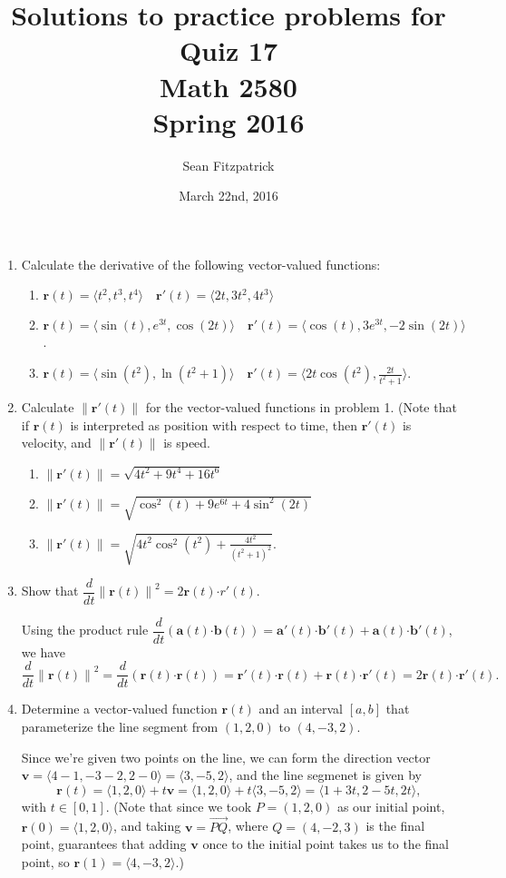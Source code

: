 \documentclass[letterpaper,12pt]{article}
\title{Solutions to practice problems for Quiz 17\\Math 2580\\Spring 2016}
\author{Sean Fitzpatrick}
\date{March 22nd, 2016}
\renewcommand{\r}{\mathbf{r}}
\newcommand{\len}[1]{\left\lVert #1\right\rVert}
\newcommand{\dotp}{\boldsymbol{\cdot}}
\begin{document}
 \maketitle


\begin{enumerate}
 \item Calculate the derivative of the following vector-valued functions:
\begin{enumerate}
 \item $\r(t) = \langle t^2, t^3, t^4\rangle \quad \r'(t) = \langle 2t, 3t^2, 4t^3\rangle$


 \item $\r(t) = \langle \sin(t), e^{3t}, \cos(2t)\rangle \quad \r'(t) = \langle \cos(t), 3e^{3t}, -2\sin(2t)\rangle$.

 \item $\r(t) = \langle \sin(t^2), \ln(t^2+1)\rangle \quad \r'(t) = \langle 2t\cos(t^2), \frac{2t}{t^2+1}\rangle$.
\end{enumerate}
 \item Calculate $\len{\r'(t)}$ for the vector-valued functions in problem 1. (Note that if $\r(t)$ is interpreted as position with respect to time, then $\r'(t)$ is velocity, and $\len{\r'(t)}$ is speed.

\begin{enumerate}
 \item $\len{\r'(t)} = \sqrt{4t^2+9t^4+16t^6}$
 \item $\len{\r'(t)} = \sqrt{\cos^2(t)+9e^{6t}+4\sin^2(2t)}$
 \item $\len{\r'(t)} = \sqrt{4t^2\cos^2(t^2)+\frac{4t^2}{(t^2+1)^2}}$.
\end{enumerate}


 \item Show that $\dfrac{d}{dt}\len{\r(t)}^2 = 2\r(t)\dotp r'(t)$.

\bigskip

Using the product rule $\dfrac{d}{dt}(\mathbf{a}(t)\dotp\mathbf{b}(t)) = \mathbf{a}'(t)\dotp\mathbf{b}'(t) + \mathbf{a}(t)\dotp\mathbf{b}'(t)$, we have
\[
 \frac{d}{dt}\len{\r(t)}^2 = \frac{d}{dt}(\r(t)\dotp \r(t)) = \r'(t)\dotp\r(t)+ \r(t)\dotp\r'(t) = 2\r(t)\dotp\r'(t).
\]
 
 \item Determine a vector-valued function $\r(t)$ and an interval $[a,b]$ that parameterize the line segment from $(1,2,0)$ to $(4,-3,2)$.

\bigskip

 Since we're given two points on the line, we can form the direction vector $\mathbf{v} = \langle 4-1, -3-2, 2-0\rangle = \langle 3, -5, 2\rangle$, and the line segmenet is given by
\[
 \r(t) = \langle 1,2,0\rangle + t\mathbf{v} = \langle 1,2,0\rangle+t\langle 3, -5, 2\rangle = \langle 1+3t, 2-5t, 2t\rangle,
\]
with $t\in [0,1]$. (Note that since we took $P=(1,2,0)$ as our initial point, $\r(0)=\langle 1,2,0\rangle$, and taking $\mathbf{v} = \overrightarrow{PQ}$, where $Q=(4,-2,3)$ is the final point, guarantees that adding $\mathbf{v}$ once to the initial point takes us to the final point, so $\r(1) = \langle 4,-3,2\rangle$.)


\end{enumerate}
\end{document}
